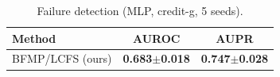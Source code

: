 \begin{table}[ht]
\centering
\caption{Failure detection (MLP, credit-g, 5 seeds).}
\label{tab:main}
\begin{tabular}{lcc}
\toprule
Method & AUROC & AUPR \\
\midrule
BFMP/LCFS (ours) & \textbf{0.683$\pm$0.018} & \textbf{0.747$\pm$0.028} \\
\bottomrule
\end{tabular}
\end{table}
